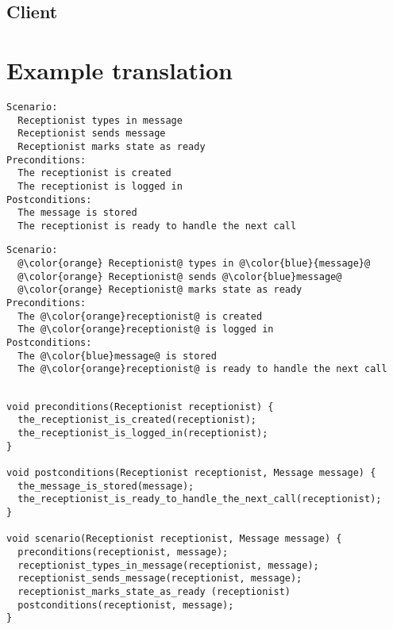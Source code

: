 \subsection{Client}

\section{Example translation}


\begin{lstlisting}[frame=single,style=usecase, caption=Use case example revisited, label=lst:uc-simple-example-revisited]
Scenario:
  Receptionist types in message
  Receptionist sends message
  Receptionist marks state as ready 
Preconditions:
  The receptionist is created
  The receptionist is logged in
Postconditions:
  The message is stored
  The receptionist is ready to handle the next call
\end{lstlisting}

\begin{lstlisting}[frame=single,style=usecase, caption=Use case example with its different parts highlighted, label=lst:uc-simple-example-highlighted-revisited]
Scenario:
  @\color{orange} Receptionist@ types in @\color{blue}{message}@
  @\color{orange} Receptionist@ sends @\color{blue}message@
  @\color{orange} Receptionist@ marks state as ready
Preconditions:
  The @\color{orange}receptionist@ is created
  The @\color{orange}receptionist@ is logged in
Postconditions:
  The @\color{blue}message@ is stored
  The @\color{orange}receptionist@ is ready to handle the next call
\end{lstlisting} 

\begin{lstlisting}[style=Dart, caption=Example of generated code without a template applied concept,label={lst:generated-test-code-example}]

void preconditions(Receptionist receptionist) {
  the_receptionist_is_created(receptionist);
  the_receptionist_is_logged_in(receptionist);
}

void postconditions(Receptionist receptionist, Message message) {
  the_message_is_stored(message);
  the_receptionist_is_ready_to_handle_the_next_call(receptionist);
}

void scenario(Receptionist receptionist, Message message) {
  preconditions(receptionist, message);
  receptionist_types_in_message(receptionist, message);
  receptionist_sends_message(receptionist, message);
  receptionist_marks_state_as_ready (receptionist)  
  postconditions(receptionist, message);
}

\end{lstlisting}


